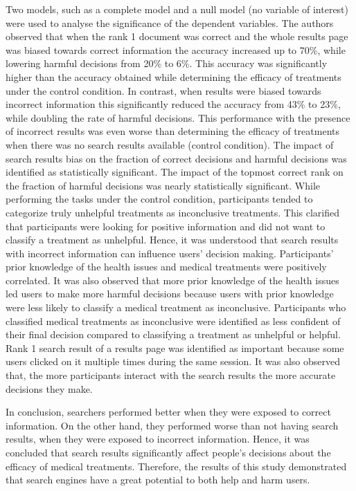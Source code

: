 \documentclass[]{article}
\begin{document}
Two models, such as a complete model and a null model (no variable of interest) were used to analyse the significance of the dependent variables. The authors observed that when the rank 1 document was correct and the whole results page was biased towards correct information the accuracy increased  up to 70\%, while lowering harmful decisions from 20\% to 6\%. This accuracy was significantly higher than the accuracy obtained while determining the efficacy of treatments under the control condition. In contrast, when results were biased towards incorrect information this significantly reduced the accuracy from 43\% to 23\%, while doubling the rate of harmful decisions. This performance with the presence of incorrect results was even worse than determining the efficacy of treatments when there was no search results available (control condition). The impact of search results bias on the fraction of correct decisions and harmful decisions was identified as statistically significant. The impact of the topmost correct rank on the fraction of harmful decisions was nearly statistically significant. While performing the tasks under the control condition, participants tended to categorize truly unhelpful treatments as inconclusive treatments. This clarified that participants were looking for positive information and did not want to classify a treatment as unhelpful. Hence, it was understood that search results with incorrect information can influence users' decision making. Participants' prior knowledge of the health issues and medical treatments were positively correlated. It was also observed that more prior knowledge of the health issues led users to make more harmful decisions because users with prior knowledge were less likely to classify a medical treatment as inconclusive. Participants who classified medical treatments as inconclusive were identified as less confident of their final decision compared to classifying a treatment as unhelpful or helpful. Rank 1 search result of a results page was identified as important because some users clicked on it multiple times during the same session. It was also observed that, the more participants interact with the search results the more accurate decisions they make.

In conclusion, searchers performed better when they were exposed to correct information. On the other hand, they performed worse than not having search results, when they were exposed to incorrect information. Hence, it was concluded that search results significantly affect people’s decisions about the efficacy of medical treatments. Therefore, the results of this study demonstrated that search engines have a great potential to both help and harm users. 
\end{document}
